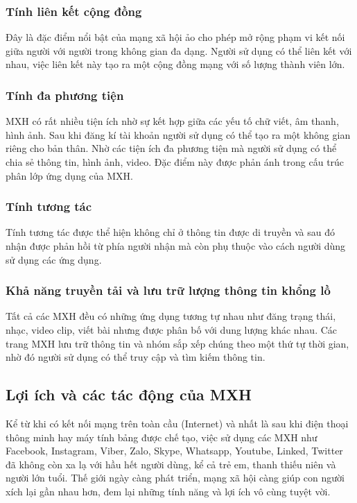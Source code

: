 		\subsubsection{Tính liên kết cộng đồng}
		Đây là đặc điểm nổi bật của mạng xã hội ảo cho phép mở rộng phạm vi kết nối giữa người với người trong không gian đa dạng. Người sử dụng có thể liên kết với nhau, việc liên kết này tạo ra một cộng đồng mạng với số lượng thành viên lớn.
		\subsubsection{Tính đa phương tiện}
		MXH có rất nhiều tiện ích nhờ sự kết hợp giữa các yếu tố chữ viết, âm thanh, hình ảnh. Sau khi đăng kí tài khoản người sử dụng có thể tạo ra một không gian riêng cho bản thân. Nhờ các tiện ích đa phương tiện mà người sử dụng có thể chia sẻ thông tin, hình ảnh, video. Đặc điểm này được phản ánh trong cấu trúc phân lớp ứng dụng của MXH.
		\subsubsection{Tính tương tác}
		Tính tương tác được thể hiện không chỉ ở thông tin được di truyền và sau đó nhận được phản hồi từ phía người nhận mà còn phụ thuộc vào cách người dùng sử dụng các ứng dụng.
		\subsubsection{Khả năng truyền tải và lưu trữ lượng thông tin khổng lồ}
		Tất cả các MXH đều có những ứng dụng tương tự nhau như đăng trạng thái, nhạc, video clip, viết bài nhưng được phân bố với dung lượng khác nhau. Các trang MXH lưu trữ thông tin và nhóm sắp xếp chúng theo một thứ tự thời gian, nhờ đó người sử dụng có thể truy cập và tìm kiếm thông tin.
	\subsection{Lợi ích và các tác động của MXH}
	Kể từ khi có kết nối mạng trên toàn cầu (Internet) và nhất là sau khi điện thoại thông minh hay máy tính bảng được chế tạo, việc sử dụng các MXH như Facebook, Instagram, Viber, Zalo, Skype, Whatsapp, Youtube, Linked, Twitter đã không còn xa lạ với hầu hết người dùng, kể cả trẻ em, thanh thiếu niên và người lớn tuổi. Thế giới ngày càng phát triển, mạng xã hội càng giúp con người xích lại gần nhau hơn, đem lại những tính năng và lợi ích vô cùng tuyệt vời.
